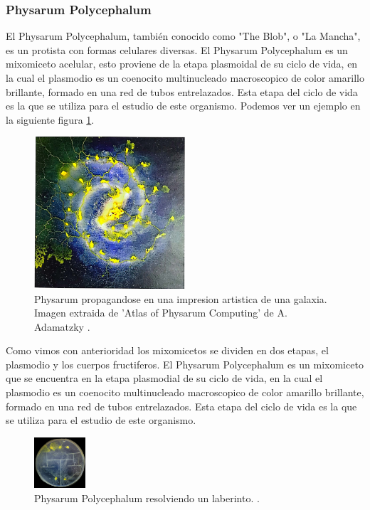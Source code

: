 \subsubsection{Physarum Polycephalum}
    El Physarum Polycephalum, tambi\'en conocido como "The Blob", 
        o "La Mancha", es un protista con formas celulares diversas. El Physarum Polycephalum
        es un mixomiceto acelular, esto proviene de la etapa plasmoidal de su ciclo de vida,
        en la cual el plasmodio es un coenocito multinucleado macroscopico de color amarillo 
        brillante, formado en una red de tubos entrelazados. Esta etapa del ciclo de vida es 
        la que se utiliza para el estudio de este organismo.\cite{Dee1960} Podemos ver un ejemplo
        en la siguiente figura \ref{fig:PhysarumPolycephalum01}.
    \begin{figure}[h]  
        \centering
        \includegraphics[width=0.5\textwidth]{./images/marco_teorico/Physarum/PhyrasumPolycephalum01.png}
        \caption{Physarum propagandose en una impresion artistica de una galaxia. Imagen extraida de 'Atlas of Physarum Computing' de A. Adamatzky \cite{Adamatzky2014}.}
        \label{fig:PhysarumPolycephalum01}
    \end{figure} 
    \vskip 0.5cm
    Como vimos con anterioridad los mixomicetos se dividen en dos etapas, el plasmodio y los cuerpos fructiferos.
        El Physarum Polycephalum es un mixomiceto que se encuentra en la etapa plasmodial de su ciclo de vida, 
        en la cual el plasmodio es un coenocito multinucleado macroscopico de color amarillo brillante, formado en una red de tubos entrelazados.
        Esta etapa del ciclo de vida es la que se utiliza para el estudio de este organismo.\cite{Dee1960}
    \begin{figure}
        \centering
        \includegraphics[width=0.17\textwidth]{./images/marco_teorico/Physarum/LaberintoPhysarum.png}
        \caption{Physarum Polycephalum resolviendo un laberinto. \cite{Adamatzky2014}.}
        \label{fig:PhysarumPolycephalum02}
    \end{figure}
